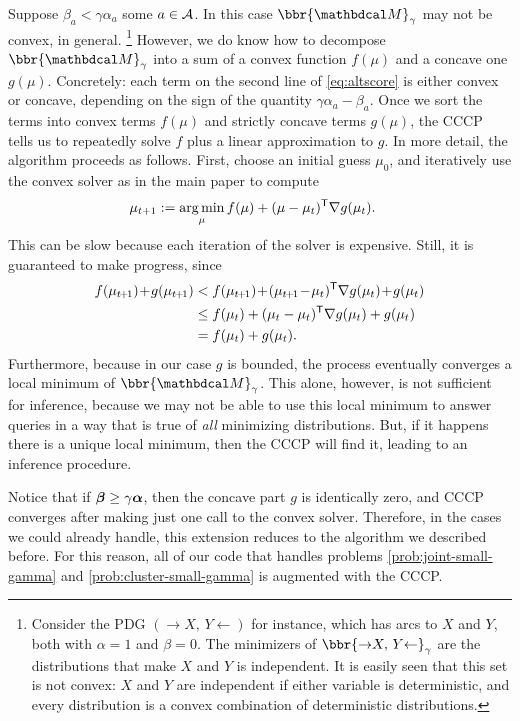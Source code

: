 \begin{subappendices}
Suppose
    $\beta_a < \gamma \alpha_a$ some $a \in \mathcal A$.
In this case $\bbr{\dg M}_\gamma$ may not be convex, in general.%
\footnote{
    Consider the PDG $({\to} X,\, Y {\gets})$ for instance, which
    has arcs to $X$ and $Y$, both with $\alpha = 1$ and $\beta = 0$.
    The minimizers of
     $\bbr{{\to} X,\, Y {\gets}}_\gamma$
        are the distributions that make $X$ and $Y$ is independent.
    It is easily seen that this set
    is not convex: $X$ and $Y$ are independent if either variable is deterministic,
    and every distribution is a convex combination of deterministic distributions.
    }
However, we do know how to decompose $\bbr{\dg M}_\gamma$ into a sum
of a convex function $f(\mu)$ and a concave one $g(\mu)$.
Concretely: each term on the second line of \eqref{eq:altscore} is either convex or concave, depending on the sign of the quantity $\gamma \alpha_a - \beta_a$.
Once we sort the terms into convex terms $f(\mu)$ and strictly concave terms $g(\mu)$,
    the CCCP tells us to repeatedly solve $f$ plus a
        linear approximation to $g$.
In more detail, the algorithm proceeds as follows.
First, choose an initial guess $\mu_0$, and iteratively use the convex solver
    as in the main paper to compute
\begin{align*}
    \mu_{t+1} &:= \operatorname*{arg\,min}_{\mu} f(\mu) + (\mu - \mu_{t})^{\sf T}
        \nabla g(\mu_t).
\end{align*}
This can be slow because each iteration of the solver is expensive.
Still, it is guaranteed to make progress, since
\def\tplus1{{t\mskip-2mu+\mskip-2mu1}}
\begin{align*}
    f(\mu_\tplus1) \!+\! g(\mu_\tplus1) &<  f(\mu_\tplus1) \!+\! (\mu_\tplus1 \!-\! \mu_t)^{\sf T} \nabla g(\mu_t) \!+\! g(\mu_t)
        \\
    &\le  f(\mu_t) + (\mu_t - \mu_{t})^{\sf T}\nabla g(\mu_t)  + g(\mu_t)
    \\
&= f(\mu_t) + g(\mu_t).
\end{align*}
Furthermore, because in our case $g$ is bounded,
    the process eventually converges a local minimum
    of $\bbr{\dg M}_\gamma$.
This alone, however, is not sufficient for inference,
because we may not be able to use this local minimum
    to answer queries in a way that is true of \emph{all} minimizing distributions.
But, if it happens there is a unique local minimum, then the CCCP will
    find it, leading to an inference procedure.




Notice that if $\boldsymbol\beta \ge \gamma\boldsymbol\alpha$, then the concave part $g$ is identically
zero, and CCCP converges after making just one call to the convex solver.
Therefore, in the cases we could already handle, this extension
reduces to the algorithm we described before.
For this reason, all of our code that handles problems
 \eqref{prob:joint-small-gamma} and \eqref{prob:cluster-small-gamma}
is augmented with the CCCP.






\end{subappendices}
